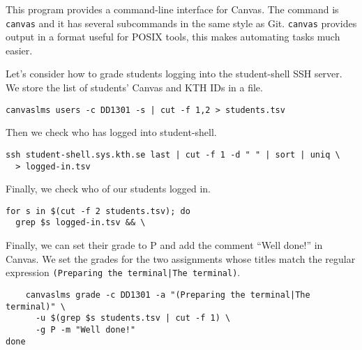 
This program provides a command-line interface for Canvas.
The command is \texttt{canvas} and it has several subcommands in the same style 
as Git.
\texttt{canvas} provides output in a format useful for POSIX tools, this makes 
automating tasks much easier.

Let's consider how to grade students logging into the student-shell SSH server.
We store the list of students' Canvas and KTH IDs in a file.
\begin{verbatim}
canvaslms users -c DD1301 -s | cut -f 1,2 > students.tsv
\end{verbatim}
Then we check who has logged into student-shell.
\begin{verbatim}
ssh student-shell.sys.kth.se last | cut -f 1 -d " " | sort | uniq \
  > logged-in.tsv
\end{verbatim}
Finally, we check who of our students logged in.
\begin{verbatim}
for s in $(cut -f 2 students.tsv); do
  grep $s logged-in.tsv && \
\end{verbatim}
Finally, we can set their grade to P and add the comment \enquote{Well done!} 
in Canvas.
We set the grades for the two assignments whose titles match the regular 
expression \texttt{(Preparing the terminal|The terminal)}.
\begin{verbatim}
    canvaslms grade -c DD1301 -a "(Preparing the terminal|The terminal)" \
      -u $(grep $s students.tsv | cut -f 1) \
      -g P -m "Well done!"
done
\end{verbatim}

